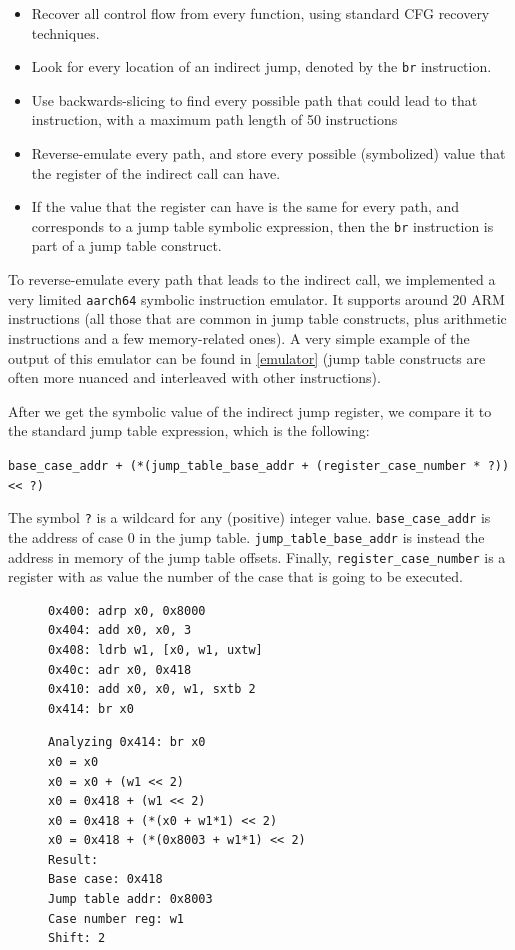 \documentclass[a4paper,11pt,oneside]{report}
\begin{document}
\begin{itemize}
	\item Recover all control flow from every function, using standard CFG recovery techniques.
	\item Look for every location of an indirect jump, denoted by the \texttt{br} instruction. 
	\item Use backwards-slicing to find every possible path that could lead to
		that instruction, with a maximum path length of 50 instructions
	\item Reverse-emulate every path, and store every possible (symbolized)
		value that the register of the indirect call can have.
	\item If the value that the register can have is the same for every path,
		and corresponds to a jump table symbolic expression, then the
		\texttt{br} instruction is part of a jump table construct.
\end{itemize}

To reverse-emulate every path that leads to the indirect call, we implemented a
very limited \texttt{aarch64} symbolic instruction emulator. It supports around
20 ARM instructions (all those that are common in jump table constructs, plus
arithmetic instructions and a few memory-related ones).  A very simple example of the
output of this emulator can be found in \autoref{emulator} (jump table constructs are 
often more nuanced and interleaved with other instructions).

After we get the symbolic value of the indirect jump register, we compare it to
the standard jump table expression, which is the following:

\texttt{base\_case\_addr + (*(jump\_table\_base\_addr + (register\_case\_number * ?)) \textless\;\textless\  ?)} 

The symbol \texttt{?} is a wildcard for any (positive) integer value.
\texttt{base\_case\_addr} is the address of case 0 in the jump table.
\texttt{jump\_table\_base\_addr} is instead the address in memory of the jump
table offsets. Finally, \texttt{register\_case\_number} is a register with as
value the number of the case that is going to be executed. 


\begin{figure}[h]
\begin{lstlisting}[basicstyle=\ttfamily\small,numbers=none]
0x400: adrp x0, 0x8000
0x404: add x0, x0, 3
0x408: ldrb w1, [x0, w1, uxtw]
0x40c: adr x0, 0x418
0x410: add x0, x0, w1, sxtb 2
0x414: br x0
\end{lstlisting}
\begin{lstlisting}[basicstyle=\ttfamily\small,numbers=none]
Analyzing 0x414: br x0
x0 = x0
x0 = x0 + (w1 << 2)
x0 = 0x418 + (w1 << 2)
x0 = 0x418 + (*(x0 + w1*1) << 2)
x0 = 0x418 + (*(0x8003 + w1*1) << 2)
Result:
Base case: 0x418
Jump table addr: 0x8003
Case number reg: w1
Shift: 2
\end{lstlisting}
\label{emulator}
\end{figure}
\end{document}
